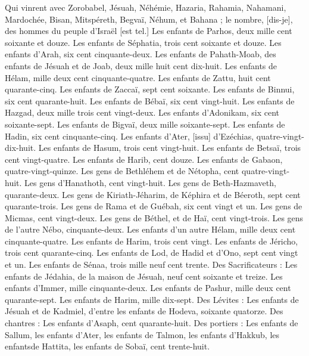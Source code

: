 \begin{multicols}{2}
{Qui vinrent avec Zorobabel, Jésuah, Néhémie, Hazaria, Rahamia, Nahamani, Mardochée, Bisan, Mitspéreth, Begvaï, Néhum, et Bahana ; le nombre, [dis-je], des hommes du peuple d'Israël [est tel.]
Les enfants de Parhos, deux mille cent soixante et douze.
Les enfants de Séphatia, trois cent soixante et douze.
Les enfants d'Arah, six cent cinquante-deux.
Les enfants de Pahath-Moab, des enfants de Jésuah et de Joab, deux mille huit cent dix-huit.
Les enfants de Hélam, mille deux cent cinquante-quatre.
Les enfants de Zattu, huit cent quarante-cinq.
Les enfants de Zaccaï, sept cent soixante.
Les enfants de Binnui, six cent quarante-huit.
Les enfants de Bébaï, six cent vingt-huit.
Les enfants de Hazgad, deux mille trois cent vingt-deux.
Les enfants d'Adonikam, six cent soixante-sept.
Les enfants de Bigvaï, deux mille soixante-sept.
Les enfants de Hadin, six cent cinquante-cinq.
Les enfants d'Ater, [issu] d'Ezéchias, quatre-vingt-dix-huit.
Les enfants de Hasum, trois cent vingt-huit.
Les enfants de Betsaï, trois cent vingt-quatre.
Les enfants de Harib, cent douze.
Les enfants de Gabaon, quatre-vingt-quinze.
Les gens de Bethléhem et de Nétopha, cent quatre-vingt-huit.
Les gens d'Hanathoth, cent vingt-huit.
Les gens de Beth-Hazmaveth, quarante-deux.
Les gens de Kiriath-Jéharim, de Képhira et de Béeroth, sept cent quarante-trois.
Les gens de Rama et de Guébah, six cent vingt et un.
Les gens de Micmas, cent vingt-deux.
Les gens de Béthel, et de Haï, cent vingt-trois.
Les gens de l'autre Nébo, cinquante-deux.
Les enfants d'un autre Hélam, mille deux cent cinquante-quatre.
Les enfants de Harim, trois cent vingt.
Les enfants de Jéricho, trois cent quarante-cinq.
Les enfants de Lod, de Hadid et d'Ono, sept cent vingt et un.
Les enfants de Sénaa, trois mille neuf cent trente.
Des Sacrificateurs : Les enfants de Jédahia, de la maison de Jésuah, neuf cent soixante et treize.
Les enfants d'Immer, mille cinquante-deux.
Les enfants de Pashur, mille deux cent quarante-sept.
Les enfants de Harim, mille dix-sept.
Des Lévites : Les enfants de Jésuah et de Kadmiel, d'entre les enfants de Hodeva, soixante quatorze.
Des chantres : Les enfants d'Asaph, cent quarante-huit.
Des portiers : Les enfants de Sallum, les enfants d'Ater, les enfants de Talmon, les enfants d'Hakkub, les enfantsde Hattita, les enfants de Sobaï, cent trente-huit.
}
\end{multicols}
